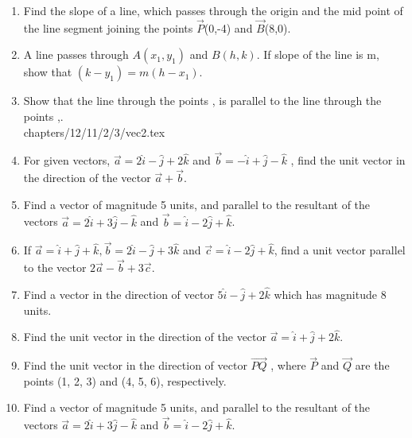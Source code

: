 \begin{enumerate}[label=\thesubsection.\arabic*,ref=\thesubsection.\theenumi]
\item Find the slope of a line, which passes through the origin and the mid point of the line segment joining the points $\vec{P}$(0,-4) and $\vec{B}$(8,0).
\label{chapters/11/10/1/5}
	\\
	\solution

\item A line passes through $A(x_1,y_1)$ and $B(h,k)$. If slope of the line is m, show that $(k-y_1)=m(h-x_1)$.
\label{chapters/11/10/1/12}
\\
\solution 

\item
Show that the line through the points , is parallel to the line through the points ,.
	\label{12.11.2.3}
\\
\solution
	 {chapters/12/11/2/3/vec2.tex}
\item For given vectors, $\vec{a}=2\hat{i}-\hat{j}+2\hat{k}$ and $\vec{b}=-\hat{i}+\hat{j}-\hat{k}$ , find the unit vector in the
direction of the vector $\vec{a}+\vec{b}$.
        \label{prob:12/10/2/9}
\\
    \solution 
		
\item Find a vector of magnitude 5 units, and parallel to the resultant of the vectors $\vec{a}=2\hat{i}+3\hat{j}-\hat{k}$ and $\vec{b}=\hat{i}-2\hat{j}+\hat{k}$.\\
\item If $\vec{a}=\hat{i}+\hat{j}+\hat{k}, \vec{b}=2\hat{i}-\hat{j}+3\hat{k}$ and $\vec{c}=\hat{i}-2\hat{j}+\hat{k}$, find a unit vector parallel to the vector $2\vec{a}-\vec{b}+3\vec{c}$.\\
	\solution
		
\item Find a vector in the direction of vector $5\hat{i}-\hat{j}+2\hat{k}$ which has magnitude 8 units.
        \label{prob:12/10/2/10const}
   \\ 
    \solution 
		
\item Find the unit vector in the direction of the vector $\vec{a}=\hat{i}+\hat{j}+2\hat{k}$.
\item Find the unit vector in the direction of vector $\overrightarrow{PQ}$ , where $\vec{P}$ and $\vec{Q}$ are the points
(1, 2, 3) and (4, 5, 6), respectively.
	\item 
Find a vector of magnitude 5 units, and parallel to the resultant of the vectors $\vec{a} = 2\hat{i}+3\hat{j}-\hat{k}$ and $\vec{b} = \hat{i}-2\hat{j}+\hat{k}$.

\end{enumerate}
